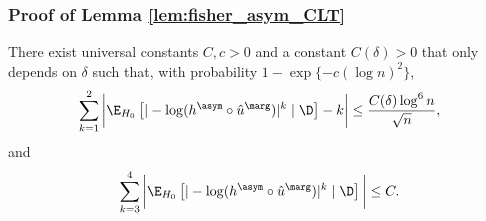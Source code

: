 \subsubsection{Proof of Lemma \ref{lem:fisher_asym_CLT}}\label{subsec:lem_fisher_asym_CLT}
\begin{lemma}\label{lem:cond_moments}
  There exist universal constants $C, c > 0$ and a constant $C(\delta) > 0$ that only depends on $\delta$ such that, with probability $1 - \exp\{-c(\log n)^2\}$,
  \begin{equation}
    \label{eq:k=12}
    \sum_{k=1}^{2}\bigg|\E_{H_0}\left[|-\log (h^\asym \circ \hat{u}^\marg)|^k\mid \D\right] - k\bigg| \le \frac{C(\delta)\log^6 n}{\sqrt{n}},
  \end{equation}
  and
  \begin{equation}
    \label{eq:k=34}
    \sum_{k=3}^{4}\bigg|\E_{H_0}\left[|-\log (h^\asym \circ \hat{u}^\marg)|^k\mid \D\right]\bigg|\le C.
  \end{equation}
\end{lemma}
